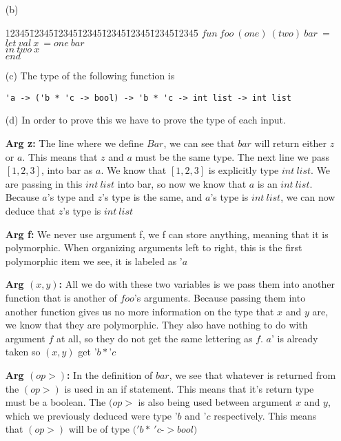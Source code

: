 \documentclass[11pt]{article}
\newenvironment{code}{\begin{tabbing}
12345\=12345\=12345\=12345\=12345\=12345\=12345\=12345\= \kill }
{\end{tabbing}}
\begin{document}
\begin{enumerate}
\begin{itemize}
\item[(b)] 
\begin{code}
$fun\ foo\ (one)\ (two)\ bar\ = $\\
\> $let\ val\ x\ = one\ bar$\\
\> $in\ two\ x$ \\
\> $end$\\ 
\end{code}
\item[(c)] The type of the following function is 
\begin{verbatim}
'a -> ('b * 'c -> bool) -> 'b * 'c -> int list -> int list

\end{verbatim}
\item[(d)] In order to prove this we have to prove the type of each input.
\\
\item[\textbf{Arg z:}] The line where we define $Bar$, we can see that $bar$ will return either $z$ or $a$.  This means that $z$ and $a$ must be the same type.  The next line we pass $[1, 2, 3]$, into bar as $a$.  We know that $[1, 2, 3]$ is explicitly type $int\ list$.  We are passing in this $int\ list$ into bar, so now we know that $a$ is an $int\ list$.  Because $a$'s type and $z$'s type is the same, and $a$'s type is $int\ list$, we can now deduce that $z$'s type is $int\ list$ 
\\
\item[\textbf{Arg f:}] We never use argument f, we f can store anything, meaning that it is polymorphic.  When organizing arguments left to right, this is the first polymorphic item we see,  it is labeled as '$a$
\\
\item[\textbf{Arg $(x, y)$:}] All we do with these two variables is we pass them into another function that is another of $foo$'s arguments.  Because passing them into another function gives us no more information on the type that $x$ and $y$ are, we know that they are polymorphic.  They also have nothing to do with argument $f$ at all, so they do not get the same lettering as $f$.  $a$' is already taken so $(x, y)$ get '$b * $'$c$
\\
\item[\textbf{Arg $(op >)$:}]  In the definition of $bar$, we see that whatever is returned from the $(op >)$ is used in an if statement.  This means that it's return type must be a boolean.  The $(op >$ is also being used between argument $x$ and $y$, which we previously deduced were type '$b$ and '$c$ respectively.  This means that $(op >)$ will be of type $('b *\ 'c $-$> bool)$ \\

\end{itemize}
\end{enumerate}
\end{document}
